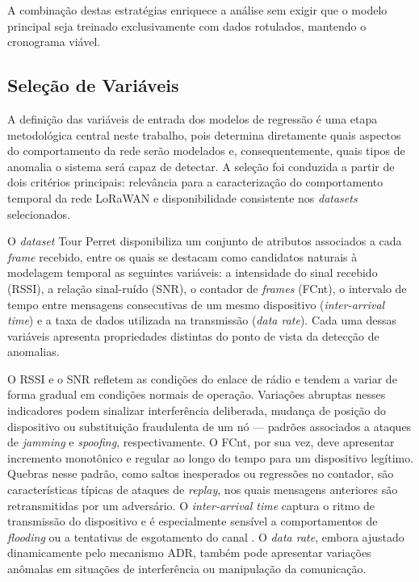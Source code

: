 A combinação destas estratégias enriquece a análise sem exigir que o modelo 
principal seja treinado exclusivamente com dados rotulados, mantendo o 
cronograma viável.


\subsection{Seleção de Variáveis}
\label{sec:selecao_variaveis}

A definição das variáveis de entrada dos modelos de regressão é uma etapa 
metodológica central neste trabalho, pois determina diretamente quais 
aspectos do comportamento da rede serão modelados e, consequentemente, quais 
tipos de anomalia o sistema será capaz de detectar. A seleção foi conduzida 
a partir de dois critérios principais: relevância para a caracterização do 
comportamento temporal da rede LoRaWAN e disponibilidade consistente nos 
\textit{datasets} selecionados.

O \textit{dataset} Tour Perret disponibiliza um conjunto de atributos 
associados a cada \textit{frame} recebido, entre os quais se destacam como 
candidatos naturais à modelagem temporal as seguintes variáveis: a 
intensidade do sinal recebido (RSSI), a relação sinal-ruído (SNR), o 
contador de \textit{frames} (FCnt), o intervalo de tempo entre mensagens 
consecutivas de um mesmo dispositivo (\textit{inter-arrival time}) e a taxa 
de dados utilizada na transmissão (\textit{data rate}). Cada uma dessas 
variáveis apresenta propriedades distintas do ponto de vista da detecção de 
anomalias.

O RSSI e o SNR refletem as condições do enlace de rádio e tendem a variar 
de forma gradual em condições normais de operação. Variações abruptas nesses 
indicadores podem sinalizar interferência deliberada, mudança de posição do 
dispositivo ou substituição fraudulenta de um nó — padrões associados a 
ataques de \textit{jamming} e \textit{spoofing}, respectivamente. O FCnt, 
por sua vez, deve apresentar incremento monotônico e regular ao longo do 
tempo para um dispositivo legítimo. Quebras nesse padrão, como saltos 
inesperados ou regressões no contador, são características típicas de 
ataques de \textit{replay}, nos quais mensagens anteriores são 
retransmitidas por um adversário. O \textit{inter-arrival time} captura o 
ritmo de transmissão do dispositivo e é especialmente sensível a 
comportamentos de \textit{flooding} ou a tentativas de esgotamento do 
canal \cite{hessel2023lorawan}. O \textit{data rate}, embora ajustado 
dinamicamente pelo mecanismo ADR, também pode apresentar variações anômalas 
em situações de interferência ou manipulação da comunicação.


